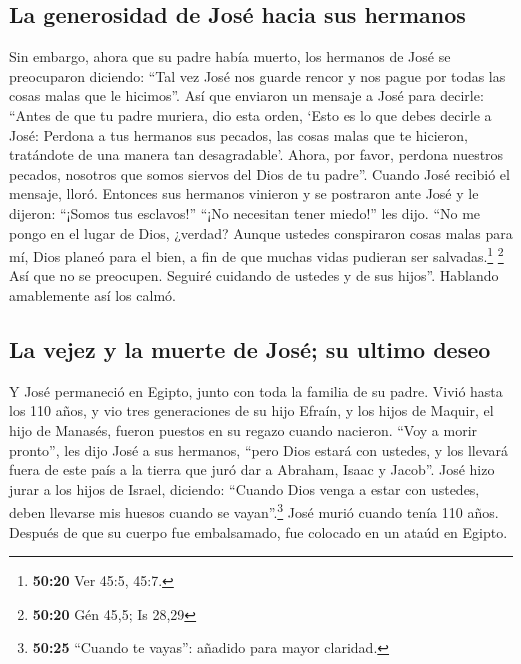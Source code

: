 \hypertarget{la-generosidad-de-josuxe9-hacia-sus-hermanos}{%
\subsection{La generosidad de José hacia sus
hermanos}\label{la-generosidad-de-josuxe9-hacia-sus-hermanos}}

 Sin embargo, ahora que su padre había muerto, los
hermanos de José se preocuparon diciendo: ``Tal vez José nos guarde
rencor y nos pague por todas las cosas malas que le hicimos''.
 Así que enviaron un mensaje a José para decirle: ``Antes
de que tu padre muriera, dio esta orden,  `Esto es lo que
debes decirle a José: Perdona a tus hermanos sus pecados, las cosas
malas que te hicieron, tratándote de una manera tan desagradable'.
Ahora, por favor, perdona nuestros pecados, nosotros que somos siervos
del Dios de tu padre''. Cuando José recibió el mensaje, lloró.
 Entonces sus hermanos vinieron y se postraron ante José
y le dijeron: ``¡Somos tus esclavos!''  ``¡No necesitan
tener miedo!'' les dijo. ``No me pongo en el lugar de Dios, ¿verdad?
 Aunque ustedes conspiraron cosas malas para mí, Dios
planeó para el bien, a fin de que muchas vidas pudieran ser
salvadas.\footnote{\textbf{50:20} Ver 45:5, 45:7.} \footnote{\textbf{50:20}
  Gén 45,5; Is 28,29}  Así que no se preocupen. Seguiré
cuidando de ustedes y de sus hijos''. Hablando amablemente así los
calmó.

\hypertarget{la-vejez-y-la-muerte-de-josuxe9-su-ultimo-deseo}{%
\subsection{La vejez y la muerte de José; su ultimo
deseo}\label{la-vejez-y-la-muerte-de-josuxe9-su-ultimo-deseo}}

 Y José permaneció en Egipto, junto con toda la familia
de su padre. Vivió hasta los 110 años,  y vio tres
generaciones de su hijo Efraín, y los hijos de Maquir, el hijo de
Manasés, fueron puestos en su regazo cuando nacieron. 
``Voy a morir pronto'', les dijo José a sus hermanos, ``pero Dios estará
con ustedes, y los llevará fuera de este país a la tierra que juró dar a
Abraham, Isaac y Jacob''.  José hizo jurar a los hijos de
Israel, diciendo: ``Cuando Dios venga a estar con ustedes, deben
llevarse mis huesos cuando se vayan''.\footnote{\textbf{50:25} ``Cuando
  te vayas'': añadido para mayor claridad.}  José murió
cuando tenía 110 años. Después de que su cuerpo fue embalsamado, fue
colocado en un ataúd en Egipto.
